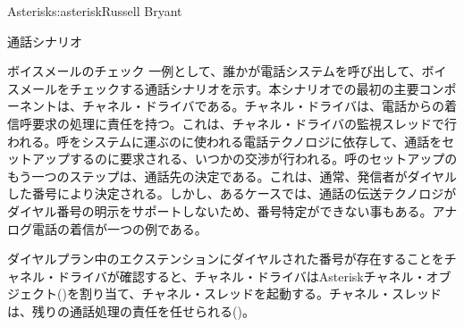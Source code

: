 \begin{aosachapter}{Asterisk}{s:asterisk}{Russell Bryant}
\begin{aosasect1}{通話シナリオ}
\begin{aosasect2}{ボイスメールのチェック}
一例として、誰かが電話システムを呼び出して、ボイスメールをチェックする通話シナリオを示す。本シナリオでの最初の主要コンポーネントは、チャネル・ドライバである。チャネル・ドライバは、電話からの着信呼要求の処理に責任を持つ。これは、チャネル・ドライバの監視スレッドで行われる。呼をシステムに運ぶのに使われる電話テクノロジに依存して、通話をセットアップするのに要求される、いつかの交渉が行われる。呼のセットアップのもう一つのステップは、通話先の決定である。これは、通常、発信者がダイヤルした番号により決定される。しかし、あるケースでは、通話の伝送テクノロジがダイヤル番号の明示をサポートしないため、番号特定ができない事もある。アナログ電話の着信が一つの例である。

ダイヤルプラン中のエクステンションにダイヤルされた番号が存在することをチャネル・ドライバが確認すると、チャネル・ドライバはAsteriskチャネル・オブジェクト()を割り当て、チャネル・スレッドを起動する。チャネル・スレッドは、残りの通話処理の責任を任せられる()。



\end{aosasect2}
\end{aosasect1}
\end{aosachapter}
